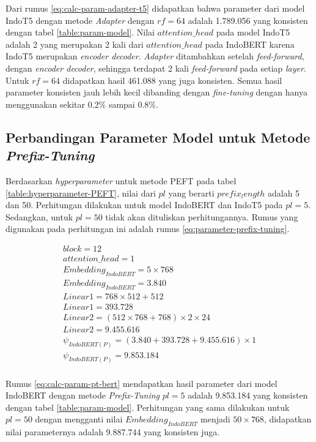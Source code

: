 Dari rumus \ref{eq:calc-param-adapter-t5} didapatkan bahwa parameter dari model IndoT5 dengan metode \textit{Adapter} dengan $rf=64$ adalah 1.789.056 yang konsisten dengan tabel \ref{table:param-model}. Nilai $attention\_head$ pada model IndoT5 adalah 2 yang merupakan 2 kali dari $attention\_head$ pada IndoBERT karena IndoT5 merupakan \textit{encoder decoder}. \textit{Adapter} ditambahkan setelah \textit{feed-forward}, dengan \textit{encoder decoder}, sehingga terdapat 2 kali \textit{feed-forward} pada setiap \textit{layer}. Untuk $rf=64$ didapatkan hasil 461.088 yang juga konsisten. Semua hasil parameter konsisten jauh lebih kecil dibanding dengan \textit{fine-tuning} dengan hanya menggunakan sekitar 0.2\% sampai 0.8\%.

\subsection{Perbandingan Parameter Model untuk Metode \textit{Prefix-Tuning}}

Berdasarkan \textit{hyperparameter} untuk metode PEFT pada tabel \ref{table:hyperparameter-PEFT}, nilai dari $pl$ yang berarti $prefix_length$ adalah 5 dan 50. Perhitungan dilakukan untuk model IndoBERT dan IndoT5 pada $pl=5$. Sedangkan, untuk $pl=50$ tidak akan dituliskan perhitungannya. Rumus yang digunakan pada perhitungan ini adalah rumus \ref{eq:parameter-prefix-tuning}.

\begin{equation}
    \begin{aligned}
        block = 12 \\
        attention\_head = 1 \\
        Embedding_{IndoBERT} = 5 \times 768 \\
        Embedding_{IndoBERT} = 3.840 \\
        Linear1 = 768 \times 512 + 512 \\
        Linear1 = 393.728 \\
        Linear2 = (512 \times 768 + 768) \times 2 \times 24 \\
        Linear2 = 9.455.616 \\
        \psi_{IndoBERT(P)} = (3.840 + 393.728 + 9.455.616) \times 1 \\
        \psi_{IndoBERT(P)} = 9.853.184 \\
    \end{aligned}
    \label{eq:calc-param-pt-bert}
\end{equation}

Rumus \ref{eq:calc-param-pt-bert} mendapatkan hasil parameter dari model IndoBERT dengan metode \textit{Prefix-Tuning} $pl=5$ adalah 9.853.184 yang konsisten dengan tabel \ref{table:param-model}. Perhitungan yang sama dilakukan untuk $pl=50$ dengan mengganti nilai $Embedding_{IndoBERT}$ menjadi $50 \times 768$, didapatkan nilai parameternya adalah 9.887.744 yang konsisten juga.

